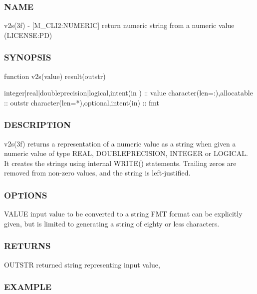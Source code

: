\subsubsection*{N\+A\+ME}

v2s(3f) -\/ \mbox{[}M\+\_\+\+C\+L\+I2\+:N\+U\+M\+E\+R\+IC\mbox{]} return numeric string from a numeric value (L\+I\+C\+E\+N\+SE\+:PD) 

\subsubsection*{S\+Y\+N\+O\+P\+S\+IS}

\begin{DoxyVerb}   function v2s(value) result(outstr)

    integer|real|doubleprecision|logical,intent(in ) :: value
    character(len=:),allocatable :: outstr
    character(len=*),optional,intent(in) :: fmt
\end{DoxyVerb}


\subsubsection*{D\+E\+S\+C\+R\+I\+P\+T\+I\+ON}

\begin{DoxyVerb}v2s(3f) returns a representation of a numeric value as a
string when given a numeric value of type REAL, DOUBLEPRECISION,
INTEGER or LOGICAL. It creates the strings using internal WRITE()
statements. Trailing zeros are removed from non-zero values, and the
string is left-justified.
\end{DoxyVerb}


\subsubsection*{O\+P\+T\+I\+O\+NS}

V\+A\+L\+UE input value to be converted to a string F\+MT format can be explicitly given, but is limited to generating a string of eighty or less characters.

\subsubsection*{R\+E\+T\+U\+R\+NS}

O\+U\+T\+S\+TR returned string representing input value,

\subsubsection*{E\+X\+A\+M\+P\+LE}

